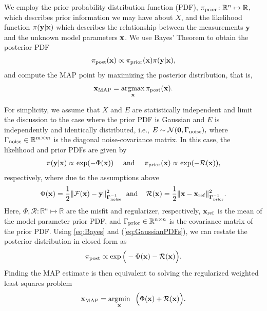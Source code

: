 \documentclass[11pt]{article}          %
\DeclareMathOperator*{\argmin}{argmin}
\DeclareMathOperator*{\argmax}{argmax}
\newcommand{\hf}{\frac12}
\newcommand{\bbR}{\mathbb{R}}
\newcommand{\bfy}{{\bf  y}}
\newcommand{\bfx}{{\bf  x}}
\begin{document}
We employ the prior probability distribution function (PDF), $\pi_{\rm prior} \colon \bbR^n \mapsto \bbR$, which describes prior information we may have about $X$, and the likelihood function $\pi(\bfy | \bfx)$ which describes the relationship between the measurements $\bfy$ and the unknown model parameters $\bfx$. We use Bayes' Theorem to obtain the posterior PDF
 \begin{align}
    \pi_{\rm post}(\bfx) \propto \pi_{\rm prior}(\bfx) \pi(\bfy | \bfx),
    \label{eq:Bayes}
 \end{align}
 and compute the MAP point by maximizing the posterior distribution, that is,
 \begin{align}
    \bfx_{\rm MAP} = \argmax_{\bfx} \pi_{\rm post}(\bfx).
 \end{align}

For simplicity, we assume that $X$ and $E$ are statistically independent
and limit the discussion to the case where the prior PDF is Gaussian and $E$ is independently and identically distributed, i.e., $E \sim \mathcal{N}({\bf0}, \Gamma_{\rm noise}),$ where $\Gamma_{\rm noise} \in \bbR^{m \times m}$ is the diagonal noise-covariance matrix. In this case, the likelihood and prior PDFs are given by 
\begin{align}
\label{eq:GaussianPDFs}
  \pi(\bfy|\bfx) \propto  \exp (-\Phi(\bfx))
  \quad \text{ and } \quad 
  \pi_{\rm prior}(\bfx) \propto \exp (-\mathcal{R}(\bfx)),
\end{align}
respectively, where due to the assumptions above
\begin{align}\label{eq:misfitReg}
  \Phi(\bfx) = \hf \| \mathcal{F} (\bfx) - \bfy \|_{\boldsymbol{\Gamma}_{\rm noise}^{-1}}^2 \; \text{ and } \; \; \; 
  \mathcal{R}(\bfx) = \hf \|\bfx - \bfx_{\rm ref} \|_{\boldsymbol{\Gamma}_{\rm{prior}}^{-1}}^2.
\end{align}
Here, $\Phi, \mathcal{R}\colon \bbR^n \mapsto \bbR$ are the misfit and regularizer, respectively, $\bfx_{\rm ref}$ is the mean of the model parameter prior PDF, and $\Gamma_{\rm prior} \in \bbR^{n \times n}$ is the covariance matrix of the prior PDF. 
Using \eqref{eq:Bayes} and (\ref{eq:GaussianPDFs}), we can restate the posterior distribution in closed form as
\begin{align}
  \pi_{\rm post} \propto \exp \Big(-\Phi(\bfx) - \mathcal{R}(\bfx)\Big).
\end{align}
Finding the MAP estimate is then equivalent to solving the regularized weighted least squares problem
\begin{align}
  \label{eq:MAP}
  \bfx_{\rm MAP} = \argmin_{\bfx} \;\; \Big(\Phi(\bfx) + \mathcal{R}(\bfx)\Big).
\end{align}
\end{document}
